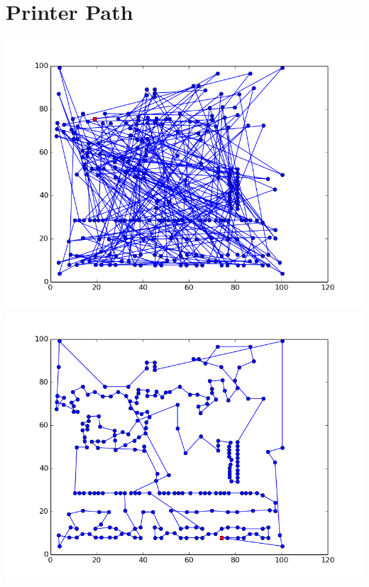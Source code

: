 \documentclass[12pt]{article}
\begin{document}
\maketitle
\section{Printer Path}
\includegraphics{images/Path/original_path.png}
\includegraphics{images/Path/best_found_path.png}
\end{document}

